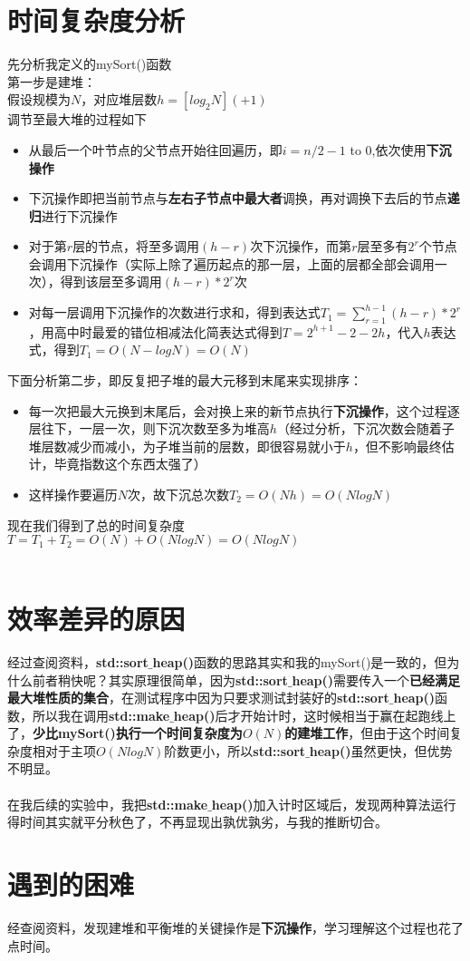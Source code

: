 \documentclass[UTF8]{ctexart}
\begin{document}
\section{时间复杂度分析}
先分析我定义的mySort()函数\\
第一步是建堆：\\
假设规模为$N$，对应堆层数$h=[log_{2}N](+1)$\\
调节至最大堆的过程如下\\
\begin{itemize}
  \item 从最后一个叶节点的父节点开始往回遍历，即$i=n/2-1$ to $0$,依次使用\textbf{下沉操作}
  \item 下沉操作即把当前节点与\textbf{左右子节点中最大者}调换，再对调换下去后的节点\textbf{递归}进行下沉操作
  \item 对于第$r$层的节点，将至多调用$(h-r)$次下沉操作，而第$r$层至多有$2^r$个节点会调用下沉操作（实际上除了遍历起点的那一层，上面的层都全部会调用一次），得到该层至多调用$(h-r)*2^r$次
  \item 对每一层调用下沉操作的次数进行求和，得到表达式$T_1=\sum_{r=1}^{h-1}(h-r)*2^r$，用高中时最爱的错位相减法化简表达式得到$T=2^{h+1}-2-2h$，代入$h$表达式，得到$T_1=O(N-logN)=O(N)$
\end{itemize}
下面分析第二步，即反复把子堆的最大元移到末尾来实现排序：
\begin{itemize}
\item 每一次把最大元换到末尾后，会对换上来的新节点执行\textbf{下沉操作}，这个过程逐层往下，一层一次，则下沉次数至多为堆高$h$（经过分析，下沉次数会随着子堆层数减少而减小，为子堆当前的层数，即很容易就小于$h$，但不影响最终估计，毕竟指数这个东西太强了）
\item 这样操作要遍历$N$次，故下沉总次数$T_2=O(Nh)=O(NlogN)$
\end{itemize}
现在我们得到了总的时间复杂度$T=T_1+T_2=O(N)+O(NlogN)=O(NlogN)$\\
\\

\section{效率差异的原因}
经过查阅资料，\textbf{std::sort$\_$heap()}函数的思路其实和我的mySort()是一致的，但为什么前者稍快呢？其实原理很简单，因为\textbf{std::sort$\_$heap()}需要传入一个\textbf{已经满足最大堆性质的集合}，在测试程序中因为只要求测试封装好的\textbf{std::sort$\_$heap()}函数，所以我在调用\textbf{std::make$\_$heap()}后才开始计时，这时候相当于赢在起跑线上了，\textbf{少比\textbf{mySort()}执行一个时间复杂度为$O(N)$的建堆工作}，但由于这个时间复杂度相对于主项$O(NlogN)$阶数更小，所以\textbf{std::sort$\_$heap()}虽然更快，但优势不明显。\\\\在我后续的实验中，我把\textbf{std::make$\_$heap()}加入计时区域后，发现两种算法运行得时间其实就平分秋色了，不再显现出孰优孰劣，与我的推断切合。


\section{遇到的困难}
经查阅资料，发现建堆和平衡堆的关键操作是\textbf{下沉操作}，学习理解这个过程也花了点时间。
\end{document}
